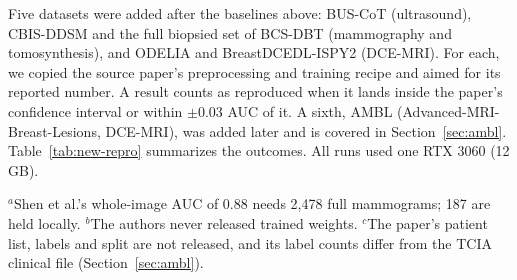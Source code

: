 \documentclass[11pt]{article}
\begin{document}
Five datasets were added after the baselines above: BUS-CoT
\citep{yu2025buscot} (ultrasound), CBIS-DDSM \citep{lee2017cbisddsm} and the
full biopsied set of BCS-DBT \citep{buda2021bcsdbt} (mammography and
tomosynthesis), and ODELIA \citep{mullerfranzes2025odelia} and
BreastDCEDL-ISPY2 \citep{fridman2025breastdcedl} (DCE-MRI). For each, we
copied the source paper's preprocessing and training recipe and aimed for its
reported number. A result counts as reproduced when it lands inside the
paper's confidence interval or within $\pm$0.03 AUC of it.
A sixth, AMBL (Advanced-MRI-Breast-Lesions, DCE-MRI), was added later and
is covered in Section~\ref{sec:ambl}. Table~\ref{tab:new-repro} summarizes the
outcomes. All runs used one RTX 3060 (12\,GB).

\begin{table}[htbp]
  \centering
  \caption{Paper-reproduction outcomes for the five new datasets. AUC unless stated; ODELIA values are macro AUC $\times 100$ over three classes.}
  \label{tab:new-repro}
  \par\smallskip\footnotesize
  $^{a}$Shen et al.'s whole-image AUC of 0.88 needs 2,478 full mammograms; 187 are held locally.
  $^{b}$The authors never released trained weights.
  $^{c}$The paper's patient list, labels and split are not released, and its label counts differ from the TCIA clinical file (Section~\ref{sec:ambl}).
\end{table}
\end{document}
